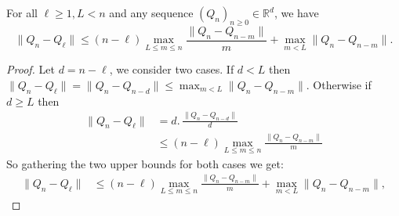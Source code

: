 \begin{lemma}\label{lem:mart-2}
	For all \( \ell \geq 1, L < n \) and any sequence \( (Q_n)_{n \geq 0} \in \mathbb{R}^d \), we have
	\[
	\|Q_n - Q_\ell\| \leq (n - \ell) \max_{L \leq m \leq n} \frac{\|Q_n - Q_{n - m}\|}{m} + \max_{m < L} \|Q_n - Q_{n - m}\|.
	\]
\end{lemma}

\begin{proof}
	Let \( d = n - \ell \), we consider two cases. If \( d < L \) then \(\|Q_n - Q_\ell\| = \|Q_n - Q_{n - d}\| \leq \max_{m < L} \|Q_n - Q_{n - m}\|.\)
	Otherwise if \( d \geq L \) then
	\begin{align*}
		\|Q_n - Q_\ell\| &= d.\,\frac{\|Q_n - Q_{n-d}\|}{d} \\		
		& \leq \left(n - \ell\right) \max_{L \leq m \leq n} \frac{\|Q_n - Q_{n-m}\|}{m}
	\end{align*}
	So gathering the two upper bounds for both cases we get:	
	\begin{align*}
		\|Q_n - Q_\ell\| &\leq (n - \ell) \max_{L \leq m \leq n} \frac{\|Q_n - Q_{n - m}\|}{m} + \max_{m < L} \|Q_n - Q_{n - m}\|,
	\end{align*}	
\end{proof}

